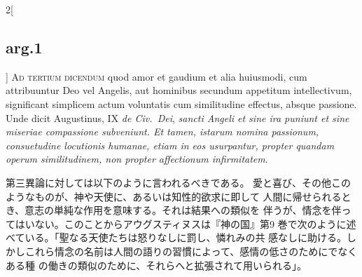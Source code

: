 \documentclass[paper=a4paper,fontsize=10pt,jafontsize=9pt,titlepage]{jlreq}
\begin{document}
\begin{paracol}{2}[\subsection{arg.1}]
{\scshape Ad tertium dicendum} quod amor et gaudium et alia huiusmodi, cum
attribuuntur Deo vel Angelis, aut hominibus secundum appetitum
intellectivum, significant simplicem actum voluntatis cum similitudine
effectus, absque passione. Unde dicit Augustinus, IX {\itshape de Civ.~Dei}, {\itshape sancti
Angeli et sine ira puniunt et sine miseriae compassione subveniunt. Et
tamen, istarum nomina passionum, consuetudine locutionis humanae, etiam
in eos usurpantur, propter quandam operum similitudinem, non propter
affectionum infirmitatem}.

\switchcolumn

第三異論に対しては以下のように言われるべきである。
愛と喜び、その他このようなものが、神や天使に、あるいは知性的欲求に即して
 人間に帰せられるとき、意志の単純な作用を意味する。それは結果への類似を
 伴うが、情念を伴ってはいない。このことからアウグスティヌスは『神の国』第9
 巻で次のように述べている。「聖なる天使たちは怒りなしに罰し、憐れみの共
 感なしに助ける。しかしこれら情念の名前は人間の語りの習慣によって、感情の低さのためにでなくある種
 の働きの類似のために、それらへと拡張されて用いられる」。

\end{paracol}
\end{document}
